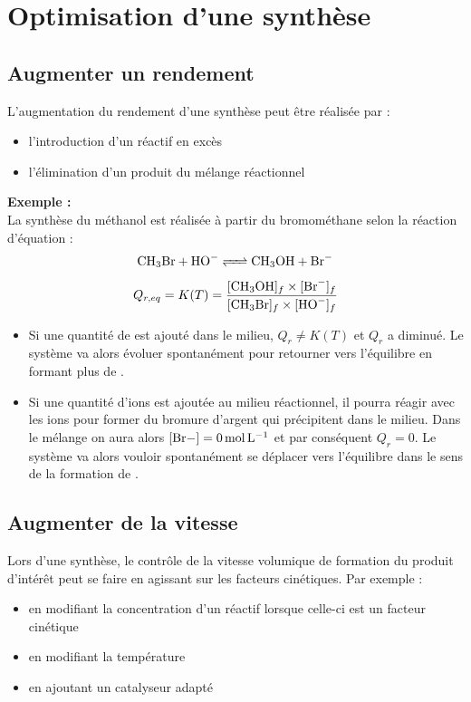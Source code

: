 \documentclass[a4paper,11pt,fleqn]{article}%
\begin{document}
	\maketitle
	
\section{Optimisation d'une synthèse}
	\subsection{Augmenter un rendement}
	L'augmentation du rendement d'une synthèse peut être réalisée par :
	\begin{itemize}
		\item l'introduction d'un réactif en excès
		\item l'élimination d'un produit du mélange réactionnel
	\end{itemize}

\textbf{Exemple :}\\
La synthèse du méthanol  est réalisée à partir du bromométhane selon la réaction d'équation : $$\ce{CH3Br + HO- <=> CH3OH + Br-}$$
$$Q_{r,eq} = K(T) = \dfrac{[\ce{CH3OH}]_f \times [\ce{Br-}]_f}{[\ce{CH3Br}]_f \times [\ce{HO-}]_f} $$
\begin{itemize}
	\item Si une quantité de  est ajouté dans le milieu, $Q_r \ne K(T)$ et $Q_r$ a diminué. Le système va alors évoluer spontanément pour retourner vers l'équilibre en formant plus de .
	\item Si une quantité d'ions  est ajoutée au milieu réactionnel, il pourra réagir avec les ions  pour former du bromure d'argent  qui précipitent dans le milieu.  Dans le mélange on aura alors $[\ce{Br-]} = \SI{0}{\mole\per\liter}$ et par conséquent $Q_r=0$. Le système va alors vouloir spontanément se déplacer vers l'équilibre dans le sens de la formation de .
\end{itemize}
	
	\subsection{Augmenter de la vitesse}
	Lors d'une synthèse, le contrôle de la vitesse volumique de formation du produit d'intérêt peut se faire en agissant sur les facteurs cinétiques. Par exemple :
	\begin{itemize}
		\item en modifiant la concentration d'un réactif lorsque celle-ci est un facteur cinétique
		\item en modifiant la température
		\item en ajoutant un catalyseur adapté
	\end{itemize}
\end{document}

